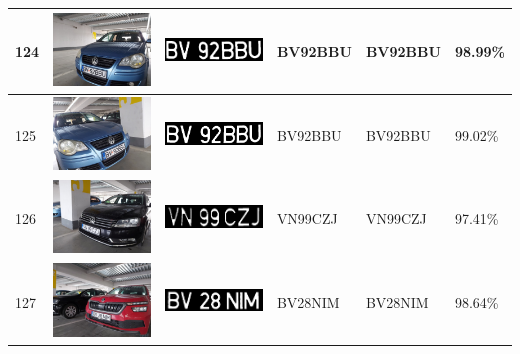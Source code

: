 \documentclass[a4paper,12pt]{report}
\begin{document}
\begin{longtable}{| m{0.6cm} | m{3cm} | m{3cm} | m{1.8cm} | m{1.8cm} | m{1.8cm} |}
    124 & \includegraphics[width=3cm,keepaspectratio]{dataset/73_d1.jpg}  & \includegraphics[width=3cm,keepaspectratio]{segmentari/124.jpg} & BV92BBU             & BV92BBU              & 98.99\%    \\ \hline
    125 & \includegraphics[width=3cm,keepaspectratio]{dataset/73_s1.jpg}  & \includegraphics[width=3cm,keepaspectratio]{segmentari/125.jpg} & BV92BBU             & BV92BBU              & 99.02\%    \\ \hline
    126 & \includegraphics[width=3cm,keepaspectratio]{dataset/74_d1.jpg}  & \includegraphics[width=3cm,keepaspectratio]{segmentari/126.jpg} & VN99CZJ             & VN99CZJ              & 97.41\%    \\ \hline
    127 & \includegraphics[width=3cm,keepaspectratio]{dataset/75_d1.jpg}  & \includegraphics[width=3cm,keepaspectratio]{segmentari/127.jpg} & BV28NIM             & BV28NIM              & 98.64\%    \\ \hline

\end{longtable}
\end{document}
